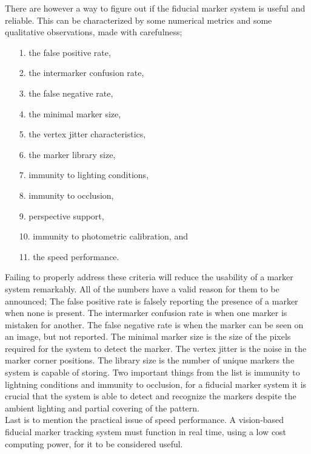 				There are however a way to figure out if the fiducial marker system is useful and reliable. This can be characterized by some numerical metrics and some qualitative observations, made with carefulness;\\
				\begin{itemize}
				\item[1.] the false positive rate,
				\item[2.] the intermarker confusion rate,
				\item[3.] the false negative rate,
				\item[4.] the minimal marker size,
				\item[5.] the vertex jitter characteristics,
				\item[6.] the marker library size,
				\item[7.] immunity to lighting conditions,
				\item[8.] immunity to occlusion,
				\item[9.] perspective support,
				\item[10.] immunity to photometric calibration, and
				\item[11.] the speed performance.\\
				\end{itemize}
				
				Failing to properly address these criteria will reduce the usability of a marker system remarkably\cite{fiducialMarkers}. All of the numbers have a valid reason for them to be announced; The false positive rate is falsely reporting the presence of a marker when none is present. The intermarker confusion rate is when one marker is mistaken for another. The false negative rate is when the marker can be seen on an image, but not reported. The minimal marker size is the size of the pixels required for the system to detect the marker. The vertex jitter is the noise in the marker corner positions. The library size is the number of unique markers the system is capable of storing. Two important things from the list is immunity to lightning conditions and immunity to occlusion, for a fiducial marker system it is crucial that the system is able to detect and recognize the markers despite the ambient lighting and partial covering of the pattern.\\
				Last is to mention the practical issue of speed performance. A vision-based fiducial marker tracking system must function in real time, using a low cost computing power, for it to be considered useful.\\
				
